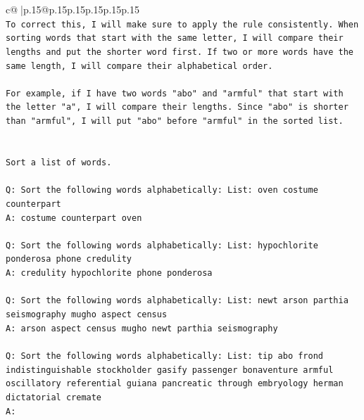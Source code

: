 \documentclass{article}
\begin{document}
{\begin{supertabular}{c@{$\;$}|p{.15\linewidth}@{}p{.15\linewidth}p{.15\linewidth}p{.15\linewidth}p{.15\linewidth}p{.15\linewidth}}
{{{\\ 
\texttt{To correct this, I will make sure to apply the rule consistently. When sorting words that start with the same letter, I will compare their lengths and put the shorter word first. If two or more words have the same length, I will compare their alphabetical order. } \\
\\ 
\texttt{For example, if I have two words "abo" and "armful" that start with the letter "a", I will compare their lengths. Since "abo" is shorter than "armful", I will put "abo" before "armful" in the sorted list.} \\
\\ 
\\ 
\texttt{Sort a list of words.} \\
\\ 
\texttt{Q: Sort the following words alphabetically: List: oven costume counterpart} \\
\texttt{A: costume counterpart oven} \\
\\ 
\texttt{Q: Sort the following words alphabetically: List: hypochlorite ponderosa phone credulity} \\
\texttt{A: credulity hypochlorite phone ponderosa} \\
\\ 
\texttt{Q: Sort the following words alphabetically: List: newt arson parthia seismography mugho aspect census} \\
\texttt{A: arson aspect census mugho newt parthia seismography} \\
\\ 
\texttt{Q: Sort the following words alphabetically: List: tip abo frond indistinguishable stockholder gasify passenger bonaventure armful oscillatory referential guiana pancreatic through embryology herman dictatorial cremate} \\
\texttt{A:} \\
            }
        }
    }
     \\ \\


\end{supertabular}}
\end{document}
